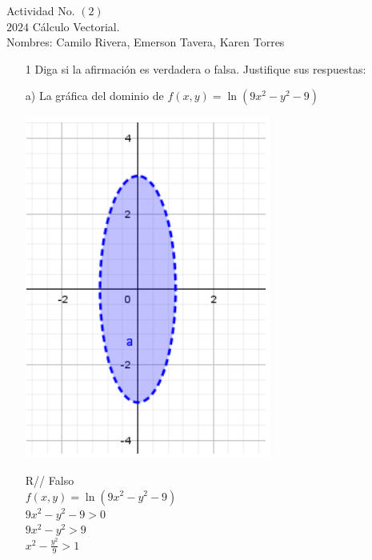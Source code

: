 \documentclass[14pt]{memoir}
\begin{document}
\begin{center}
			\centering
			Actividad No. $(2)$\\
			$2024$ Cálculo Vectorial.\\
			Nombres:  Camilo Rivera, Emerson Tavera, Karen Torres
\end{center}

\begin{enumerate}

	\item[ 1] Diga si la afirmación es verdadera o falsa. Justifique sus respuestas: 
	
	
	
	\item[ a)] La gráfica del dominio de $f(x, y) = \ln(9x^2 - y^2 - 9)$ \\
	\begin{center}
	\includegraphics[scale=1]{assets/t_2_1.png} 
	\end{center}
	
	R// Falso\\
	 $f(x, y) = \ln(9x^2 - y^2 - 9)$ \\
	$9x^2 - y^2 - 9 > 0$\\
	$9x^2 - y^2 > 9$\\
	$x^2 - \frac{y^2}{9} > 1$\\ 
	

\end{enumerate}
\end{document}
